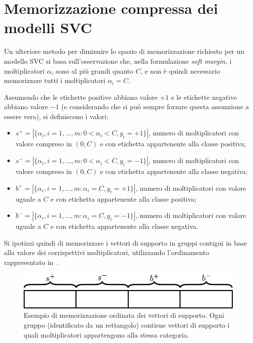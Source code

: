 \section{Memorizzazione compressa dei modelli SVC}\label{sec:memorizzazione_compressa}
Un ulteriore metodo per diminuire lo spazio di memorizzazione richiesto per un modello SVC si basa sull'osservazione che, nella formulazione \emph{soft margin}, i moltiplicatori $\alpha_i$ sono al più grandi quanto $C$, e non è quindi necessario memorizzare tutti i moltiplicatori $\alpha_i = C$.

Assumendo che le etichette positive abbiano valore $+1$ e le etichette negative abbiano valore $-1$ (e considerando che si può sempre forzare questa assunzione a essere vera), si definiscono i valori:
\begin{itemize}
    \item $s^+ = |\{\alpha_i, i=1,\dots,m : 0 < \alpha_i < C, y_i=+1\}|$, numero di moltiplicatori con valore compreso in $(0, C)$ e con etichetta appartenente alla classe positiva;
    \item $s^- = |\{\alpha_i, i=1,\dots,m : 0 < \alpha_i < C, y_i=-1\}|$, numero di moltiplicatori con valore compreso in $(0, C)$ e con etichetta appartenente alla classe negativa;
    \item $b^+ = |\{\alpha_i, i=1,\dots,m : \alpha_i = C, y_i=+1\}|$, numero di moltiplicatori con valore uguale a $C$ e con etichetta appartenente alla classe positiva;
    \item $b^- = |\{\alpha_i, i=1,\dots,m : \alpha_i = C, y_i=-1\}|$, numero di moltiplicatori con valore uguale a $C$ e con etichetta appartenente alla classe negativa.
\end{itemize}
Si ipotizzi quindi di memorizzare i vettori di supporto in gruppi contigui in base alla valore dei corrispettivi moltiplicatori, utilizzando l'ordinamento rappresentato in~.
\begin{figure}
    \centering
    \includegraphics{img/memorizzazione_sv.pdf}
    \caption{Esempio di memorizzazione ordinata dei vettori di supporto. Ogni gruppo (identificato da un rettangolo) contiene vettori di supporto i quali moltiplicatori appartengono alla stessa categoria.}
    \label{fig:schema_memorizzazione_sv}
\end{figure}

